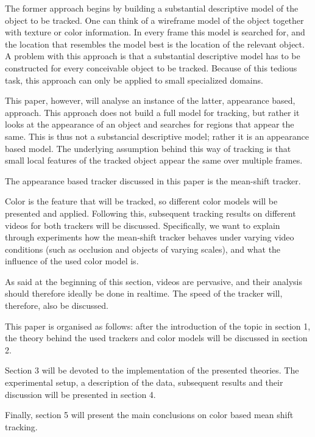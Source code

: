 \documentclass[a4paper,11pt]{article}
\begin{document}
The former approach begins by building a substantial descriptive model of the object to be tracked. One can think of a wireframe model of the object together with texture or color information. In every frame this model is searched for, and the location that resembles the model best is the location of the relevant object.  A problem with this approach is that a substantial descriptive model has to be constructed for every conceivable object to be tracked.  Because of this tedious task, this approach can only be applied to small specialized domains.  



This paper, however, will analyse an instance of the latter, appearance based, approach. This approach does not build a full model for tracking, but rather it looks at the appearance of an object and searches for regions that appear the same.  This is thus not a substancial descriptive model; rather it is an appearance based model. The underlying assumption behind this way of tracking is that small local features of the tracked object appear the same over multiple frames. %

The appearance based tracker discussed in this paper is the mean-shift tracker. 



Color is the feature that will be tracked, so different color models will be presented and applied. Following this, subsequent tracking results on different videos for both trackers will be discussed. Specifically, we want to explain through experiments how the mean-shift tracker behaves under varying video conditions (such as occlusion and objects of varying scales), and what the influence of the used color model is.

	As said at the beginning of this section, videos are pervasive, and their analysis should therefore ideally be done in realtime. The speed of the tracker will, therefore, also be discussed. 

	

	This paper is organised as follows:  after the introduction of the topic in section 1, the theory behind the used trackers and color models will be discussed in section 2.

	Section 3 will be devoted to the implementation of the presented theories. The experimental setup, a description of the data, subsequent results and their discussion will be presented in section 4. 

	Finally, section 5 will present the main conclusions on color based mean shift tracking.
\end{document}
